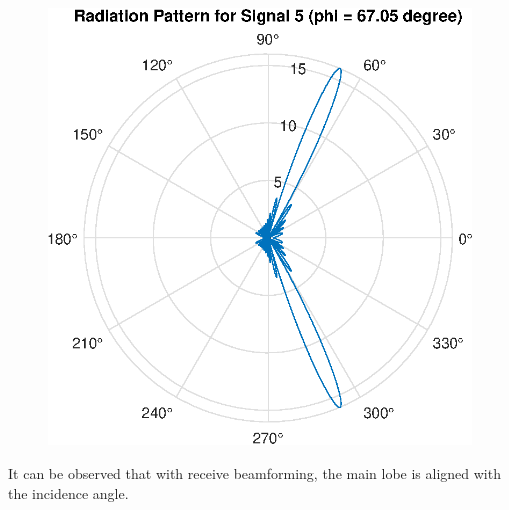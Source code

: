 \begin{figure}[H]
    \centering
    \includegraphics[scale = 0.7]{s5.eps}
\end{figure}
It can be observed that with receive beamforming, the main lobe is aligned with the incidence angle.